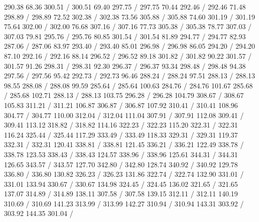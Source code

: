 { 290.38 68.36 300.51 /
 300.51 69.40 297.75 /
 297.75 70.44 292.46 /
 292.46 71.48 298.89 /
 298.89 72.52 302.38 /
 302.38 73.56 305.88 /
 305.88 74.60 301.19 /
 301.19 75.64 302.00 /
 302.00 76.68 307.16 /
 307.16 77.73 305.38 /
 305.38 78.77 307.03 /
 307.03 79.81 295.76 /
 295.76 80.85 301.54 /
 301.54 81.89 294.77 /
 294.77 82.93 287.06 /
 287.06 83.97 293.40 /
 293.40 85.01 296.98 /
 296.98 86.05 294.20 /
 294.20 87.10 292.16 /
 292.16 88.14 296.52 /
 296.52 89.18 301.82 /
 301.82 90.22 301.57 /
 301.57 91.26 298.31 /
 298.31 92.30 296.37 /
 296.37 93.34 298.48 /
 298.48 94.38 297.56 /
 297.56 95.42 292.73 /
 292.73 96.46 288.24 /
 288.24 97.51 288.13 /
 288.13 98.55 288.08 /
 288.08 99.59 285.64 /
 285.64 100.63 284.76 /
 284.76 101.67 285.68 /
 285.68 102.71 288.13 /
 288.13 103.75 296.28 /
 296.28 104.79 308.67 /
 308.67 105.83 311.21 /
 311.21 106.87 306.87 /
 306.87 107.92 310.41 /
 310.41 108.96 304.77 /
 304.77 110.00 312.04 /
 312.04 111.04 307.91 /
 307.91 112.08 309.41 /
 309.41 113.12 318.82 /
 318.82 114.16 322.23 /
 322.23 115.20 322.31 /
 322.31 116.24 325.44 /
 325.44 117.29 333.49 /
 333.49 118.33 329.31 /
 329.31 119.37 332.31 /
 332.31 120.41 338.81 /
 338.81 121.45 336.21 /
 336.21 122.49 338.78 /
 338.78 123.53 338.43 /
 338.43 124.57 338.96 /
 338.96 125.61 344.31 /
 344.31 126.65 343.57 /
 343.57 127.70 342.80 /
 342.80 128.74 340.92 /
 340.92 129.78 336.80 /
 336.80 130.82 326.23 /
 326.23 131.86 322.74 /
 322.74 132.90 331.01 /
 331.01 133.94 330.67 /
 330.67 134.98 324.45 /
 324.45 136.02 321.65 /
 321.65 137.07 314.89 /
 314.89 138.11 307.58 /
 307.58 139.15 312.11 /
 312.11 140.19 310.69 /
 310.69 141.23 313.99 /
 313.99 142.27 310.94 /
 310.94 143.31 303.92 /
 303.92 144.35 301.04 /
}

